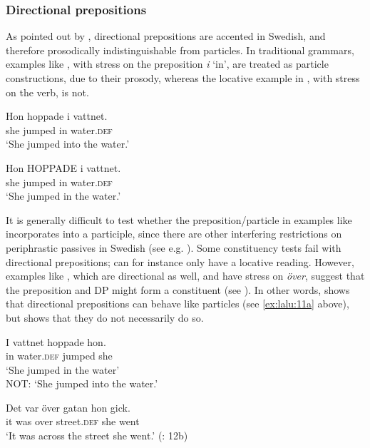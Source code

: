 \documentclass[output=paper]{langscibook}
\begin{document}
\subsubsection{Directional prepositions} 

As pointed out by \citet{Svenonius2003}, directional prepositions are accented in Swedish, and therefore prosodically indistinguishable from particles. In traditional grammars, examples like , with stress on the preposition \textit{i} ‘in’, are treated as particle constructions, due to their prosody, whereas the locative example in , with stress on the verb, is not.


\ea\label{ex:lalu:15}
\ea\label{ex:lalu:15a}
\gll  Hon   hoppade    i   vattnet. \\
    she     jumped     in   water\textsc{.def}\\
\glt `She jumped into the water.'

\ex\label{ex:lalu:15b}
\gll  Hon   HOPPADE   i   vattnet. \\
    she     jumped       in   water\textsc{.def}\\
\glt `She jumped in the water.'
\z
\z


It is generally difficult to test whether the preposition/particle in examples like  incorporates into a participle, since there are other interfering restrictions on periphrastic passives in Swedish (see e.g. \citealt{Engdahl2006}). Some constituency tests fail with directional prepositions;  can for instance only have a locative reading. However, examples like , which are directional as well, and have stress on \textit{över}, suggest that the preposition and DP might form a constituent (see \citealt{Tungseth2006}). In other words,  shows that directional prepositions can behave like particles (see \ref{ex:lalu:11a} above), but  shows that they do not necessarily do so.


\ea\label{ex:lalu:16}
\ea\label{ex:lalu:16a}
\gll  I     vattnet   hoppade   hon. \\
    in     water\textsc{.def}  jumped   she\\
\glt `She jumped in the water\textsc{’}\\
    NOT: ‘She jumped into the water.'

\ex\label{ex:lalu:16b}
\gll  Det  var   över   gatan     hon   gick.\\
    it     was  over   street\textsc{.def}   she   went\\
\glt `It was across the street she went.'     (\citealt{Svenonius2003}: 12b)\\
\z
\z
\end{document}
